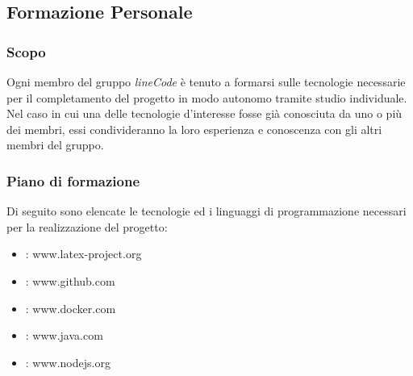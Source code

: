 \subsection{Formazione Personale}

	\subsubsection{Scopo}
	Ogni membro del gruppo \textit{lineCode} è tenuto a formarsi sulle tecnologie necessarie per il completamento del progetto in modo autonomo tramite studio individuale. Nel caso in cui una delle tecnologie d'interesse fosse già conosciuta da uno o più dei membri, essi condivideranno la loro esperienza e conoscenza con gli altri membri del gruppo.

	\subsubsection{Piano di formazione}
	Di seguito sono elencate le tecnologie ed i linguaggi di programmazione necessari per la realizzazione del progetto:
	\begin{itemize}
		\item \glock{\LaTeX} : www.latex-project.org
		\item {} : www.github.com
		\item {} : www.docker.com
		\item {} : www.java.com
		\item {} : www.nodejs.org
	\end{itemize}

